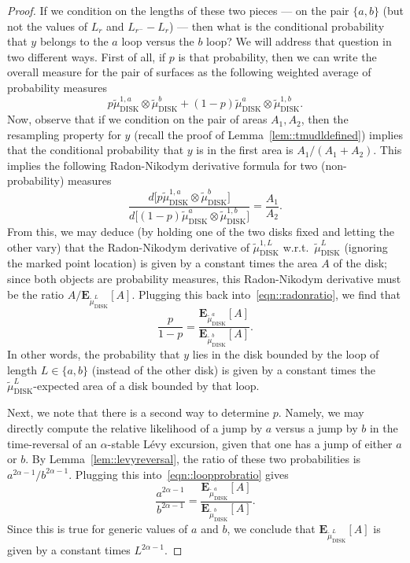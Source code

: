 \documentclass[JEP,XML,SOM,Unicode]{cedram}
\theoremstyle{plain}
\numberwithin{theorem}{section}
\theoremstyle{definition}
\newcommand \E {{\mathbf E}}
\newcommand{\tmudonel}{\wt{\mu}_{ \mathrm{DISK}}^{1, L}}
\newcommand{\tmudl}{\wt{\mu}_{\mathrm{DISK}}^L}
\def\tmudlset#1{\wt{\mu}_{\mathrm{DISK}}^{#1}}
\def\tmudonelset#1{\wt{\mu}_{ \mathrm{DISK}}^{1, #1}}
\let\wt\widetilde
\begin{document}
\begin{proof}
If we condition on the lengths of these two pieces --- \ie on the pair $\{a,b\}$ (but not the values of $L_r$ and $L_{r^-} - L_r$) --- then what is the conditional probability that $y$ belongs to the $a$ loop versus the $b$ loop? We will address that question in two different ways. First of all, if $p$ is that probability, then we can write the overall measure for the pair of surfaces as the following weighted average of probability measures
\[
p \tmudonelset{a} \otimes \tmudlset{b} + (1-p) \tmudlset{a} \otimes \tmudonelset{b}.
\]
Now, observe that if we condition on the pair of areas $A_1, A_2$, then the resampling property for $y$ (recall the proof of Lemma~\ref{lem::tmudldefined}) implies that the conditional probability that $y$ is in the first area is $A_1/(A_1 + A_2)$. This implies the following Radon-Nikodym derivative formula for two (non-probability) measures
\begin{equation}
\label{eqn::radonratio}
\frac{ d \bigl[ p \tmudonelset{a} \otimes \tmudlset{b} \bigr] }{d \bigl[(1-p) \tmudlset{a} \otimes \tmudonelset{b} \bigr]} = \frac{A_1}{A_2}.
\end{equation}
From this, we may deduce (by holding one of the two disks fixed and letting the other vary) that the Radon-Nikodym derivative of $\tmudonel$ w.r.t.\ $\tmudl$ (ignoring the marked point location) is given by a constant times the area $A$ of the disk; since both objects are probability measures, this Radon-Nikodym derivative must be the ratio $A/\E_{\tmudl}[ A]$. Plugging this back into~\eqref{eqn::radonratio}, we find that
\begin{equation}
\label{eqn::loopprobratio}
\frac{p}{1-p} = \frac{\E_{\tmudlset{a}} [A]}{\E_{\tmudlset{b}} [A]}.
\end{equation}
In other words, the probability that $y$ lies in the disk bounded by the loop of length $L \in \{a,b\}$ (instead of the other disk) is given by a constant times the $\tmudl$-expected area of a disk bounded by that loop.

Next, we note that there is a second way to determine $p$. Namely, we may directly compute the relative likelihood of a jump by $a$ versus a jump by $b$ in the time-reversal of an $\alpha$-stable Lévy excursion, given that one has a jump of either $a$ or $b$. By Lemma~\ref{lem::levyreversal}, the ratio of these two probabilities is $a^{2\alpha-1}/b^{2\alpha-1}.$ Plugging this into~\eqref{eqn::loopprobratio} gives
\[
\frac{a^{2\alpha-1}}{b^{2\alpha-1}} = \frac{\E_{\tmudlset{a}} [A]}{\E_{\tmudlset{b}} [A]}.
\]
Since this is true for generic values of $a$ and $b$, we conclude that $\E_{\tmudl}[A]$ is given by a constant times $L^{2\alpha - 1}$.
\end{proof}
\end{document}
